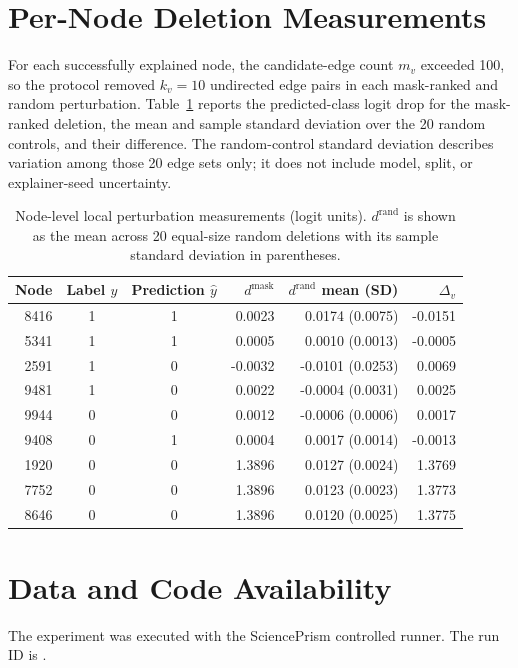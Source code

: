 \documentclass[11pt,a4paper]{article}
\begin{document}
\section{Per-Node Deletion Measurements}
For each successfully explained node, the candidate-edge count $m_v$ exceeded 100, so the protocol removed $k_v=10$ undirected edge pairs in each mask-ranked and random perturbation. Table~\ref{tab:nodeeffects} reports the predicted-class logit drop for the mask-ranked deletion, the mean and sample standard deviation over the 20 random controls, and their difference. The random-control standard deviation describes variation among those 20 edge sets only; it does not include model, split, or explainer-seed uncertainty.

\begin{table}[ht]
\centering
\small
\caption{Node-level local perturbation measurements (logit units). $d^{\mathrm{rand}}$ is shown as the mean across 20 equal-size random deletions with its sample standard deviation in parentheses.}
\label{tab:nodeeffects}
\begin{tabular}{r c c r r r}
\toprule
Node & Label $y$ & Prediction $\hat y$ & $d^{\mathrm{mask}}$ & $d^{\mathrm{rand}}$ mean (SD) & $\Delta_v$\\
\midrule
8416 & 1 & 1 & 0.0023 & 0.0174 (0.0075) & -0.0151\\
5341 & 1 & 1 & 0.0005 & 0.0010 (0.0013) & -0.0005\\
2591 & 1 & 0 & -0.0032 & -0.0101 (0.0253) & 0.0069\\
9481 & 1 & 0 & 0.0022 & -0.0004 (0.0031) & 0.0025\\
9944 & 0 & 0 & 0.0012 & -0.0006 (0.0006) & 0.0017\\
9408 & 0 & 1 & 0.0004 & 0.0017 (0.0014) & -0.0013\\
1920 & 0 & 0 & 1.3896 & 0.0127 (0.0024) & 1.3769\\
7752 & 0 & 0 & 1.3896 & 0.0123 (0.0023) & 1.3773\\
8646 & 0 & 0 & 1.3896 & 0.0120 (0.0025) & 1.3775\\
\bottomrule
\end{tabular}
\end{table}

\section*{Data and Code Availability}
The experiment was executed with the SciencePrism controlled runner. The run ID is .
\end{document}
